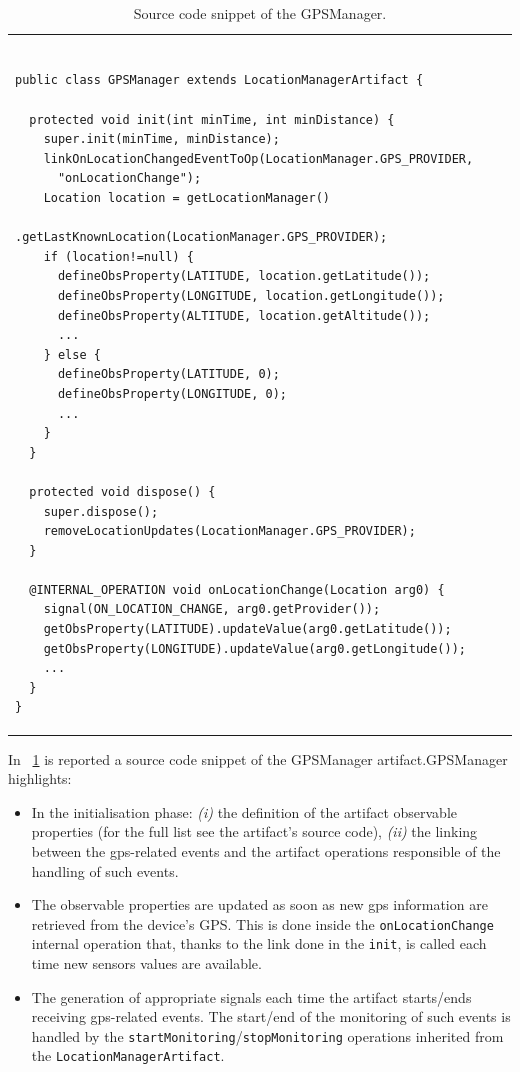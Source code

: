 \documentclass[11pt]{report}
\newcommand\labeltab[1]{\label{tb:#1}}
\newcommand\xt[1]{\tablename~\ref{tb:#1}}
\newcommand\code[1]{{\mbox{\texttt{{#1}}}}}
\begin{document}
\begin{table}[!ht]
\begin{tabular} {p{10cm}}
\begin{minipage}{10cm}
{\scriptsize \begin{verbatim}

public class GPSManager extends LocationManagerArtifact {

  protected void init(int minTime, int minDistance) {
    super.init(minTime, minDistance);
    linkOnLocationChangedEventToOp(LocationManager.GPS_PROVIDER, 
      "onLocationChange");
    Location location = getLocationManager()
                          .getLastKnownLocation(LocationManager.GPS_PROVIDER);
    if (location!=null) {
      defineObsProperty(LATITUDE, location.getLatitude());
      defineObsProperty(LONGITUDE, location.getLongitude());
      defineObsProperty(ALTITUDE, location.getAltitude());
      ...
    } else {
      defineObsProperty(LATITUDE, 0);
      defineObsProperty(LONGITUDE, 0);
      ...
    }
  }
		
  protected void dispose() {
    super.dispose();
    removeLocationUpdates(LocationManager.GPS_PROVIDER);
  }
	
  @INTERNAL_OPERATION void onLocationChange(Location arg0) {
    signal(ON_LOCATION_CHANGE, arg0.getProvider());
    getObsProperty(LATITUDE).updateValue(arg0.getLatitude());
    getObsProperty(LONGITUDE).updateValue(arg0.getLongitude());
    ...
  }
}
\end{verbatim}}
\end{minipage}
\end{tabular}
\caption{Source code snippet of the \textsf{GPSManager}.}
    \labeltab{GPSManager}
\end{table}


In \xt{GPSManager} is reported a source code snippet of the \textsf{GPSManager} artifact.\textsf{GPSManager} highlights:
\begin{itemize}
%
\item In the initialisation phase: \textit{(i)} the definition of the artifact observable properties (for the full list see the artifact's source code), \textit{(ii)} the linking between the gps-related events and the artifact operations responsible of the handling of such events.
%
\item The observable properties are updated as soon as new gps information are retrieved from the device's GPS. This is done inside the \code{onLocationChange} internal operation that, thanks to the link done in the \code{init}, is called each time new sensors values are available.
%
\item The generation of appropriate signals each time the artifact starts/ends receiving gps-related events. The start/end of the monitoring of such events is handled by the \code{startMonitoring}/\code{stopMonitoring} operations inherited from the \code{LocationManagerArtifact}.
\end{itemize}
\end{document}
